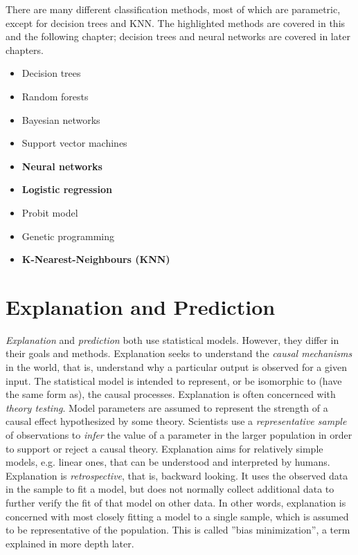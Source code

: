 There are many different classification methods, most of which are parametric, except for decision trees and KNN. The highlighted methods are covered in this and the following chapter; decision trees and neural networks are covered in later chapters.

\begin{itemize}
   \item Decision trees
   \item Random forests
   \item Bayesian networks
   \item Support vector machines
   \item \textbf{Neural networks}
   \item \textbf{Logistic regression}
   \item Probit model
   \item Genetic programming
   \item \textbf{K-Nearest-Neighbours (KNN)}
\end{itemize}

\section{Explanation and Prediction}

\emph{Explanation} and \emph{prediction} both use statistical models. However, they differ in their goals and methods. Explanation seeks to understand the \emph{causal mechanisms} in the world, that is, understand why a particular output is observed for a given input. The statistical model is intended to represent, or be isomorphic to (have the same form as), the causal processes. Explanation is often concernced with \emph{theory testing}. Model parameters are assumed to represent the strength of a causal effect hypothesized by some theory. Scientists use a \emph{representative sample} of observations to \emph{infer} the value of a parameter in the larger population in order to support or reject a causal theory. Explanation aims for relatively simple models, e.g. linear ones, that can be understood and interpreted by humans. Explanation is \emph{retrospective}, that is, backward looking. It uses the observed data in the sample to fit a model, but does not normally collect additional data to further verify the fit of that model on other data. In other words, explanation is concerned with most closely fitting a model to a single sample, which is assumed to be representative of the population. This is called ''bias minimization'', a term explained in more depth later. 

